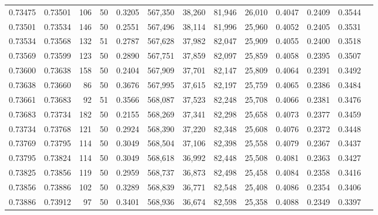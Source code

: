 \begin{tabular}{rrrrrrrrrrrrr}
0.73475 & 0.73501 &   106 &  50 &                                     0.3205 & 567,350 &  38,260 &  81,946 &  26,010 & 0.4047 & 0.2409 & 0.3544 \\
0.73501 & 0.73534 &   146 &  50 &                                     0.2551 & 567,496 &  38,114 &  81,996 &  25,960 & 0.4052 & 0.2405 & 0.3531 \\
0.73534 & 0.73568 &   132 &  51 &                                     0.2787 & 567,628 &  37,982 &  82,047 &  25,909 & 0.4055 & 0.2400 & 0.3518 \\
0.73569 & 0.73599 &   123 &  50 &                                     0.2890 & 567,751 &  37,859 &  82,097 &  25,859 & 0.4058 & 0.2395 & 0.3507 \\
0.73600 & 0.73638 &   158 &  50 &                                     0.2404 & 567,909 &  37,701 &  82,147 &  25,809 & 0.4064 & 0.2391 & 0.3492 \\
0.73638 & 0.73660 &    86 &  50 &                                     0.3676 & 567,995 &  37,615 &  82,197 &  25,759 & 0.4065 & 0.2386 & 0.3484 \\
0.73661 & 0.73683 &    92 &  51 &                                     0.3566 & 568,087 &  37,523 &  82,248 &  25,708 & 0.4066 & 0.2381 & 0.3476 \\
0.73683 & 0.73734 &   182 &  50 &                                     0.2155 & 568,269 &  37,341 &  82,298 &  25,658 & 0.4073 & 0.2377 & 0.3459 \\
0.73734 & 0.73768 &   121 &  50 &                                     0.2924 & 568,390 &  37,220 &  82,348 &  25,608 & 0.4076 & 0.2372 & 0.3448 \\
0.73769 & 0.73795 &   114 &  50 &                                     0.3049 & 568,504 &  37,106 &  82,398 &  25,558 & 0.4079 & 0.2367 & 0.3437 \\
0.73795 & 0.73824 &   114 &  50 &                                     0.3049 & 568,618 &  36,992 &  82,448 &  25,508 & 0.4081 & 0.2363 & 0.3427 \\
0.73825 & 0.73856 &   119 &  50 &                                     0.2959 & 568,737 &  36,873 &  82,498 &  25,458 & 0.4084 & 0.2358 & 0.3416 \\
0.73856 & 0.73886 &   102 &  50 &                                     0.3289 & 568,839 &  36,771 &  82,548 &  25,408 & 0.4086 & 0.2354 & 0.3406 \\
0.73886 & 0.73912 &    97 &  50 &                                     0.3401 & 568,936 &  36,674 &  82,598 &  25,358 & 0.4088 & 0.2349 & 0.3397 \\

\end{tabular}

